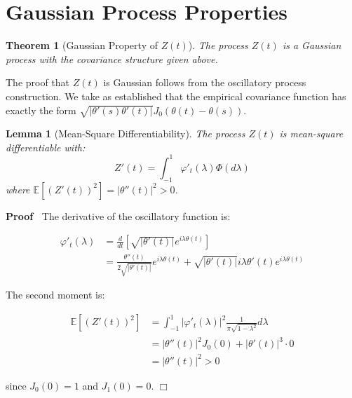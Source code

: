 \documentclass{article}
\newenvironment{proof}{\noindent\textbf{Proof\ }}{\hspace*{\fill}$\Box$\medskip}
\newtheorem{lemma}{Lemma}
\newtheorem{theorem}{Theorem}
\begin{document}
\section{Gaussian Process Properties}

\begin{theorem}
  [Gaussian Property of $Z (t)$] The process $Z (t)$ is a Gaussian process
  with the covariance structure given above.
\end{theorem}

\begin{remark}
  The proof that $Z (t)$ is Gaussian follows from the oscillatory process
  construction. We take as established that the empirical covariance function
  has exactly the form $\sqrt{| \theta' (s) \theta' (t) |} J_0  (\theta (t) -
  \theta (s))$.
\end{remark}

\begin{lemma}
  [Mean-Square Differentiability] The process $Z (t)$ is mean-square
  differentiable with:
  \begin{equation}
    Z' (t) = \int_{- 1}^1 \varphi'_t (\lambda) \Phi (d \lambda)
  \end{equation}
  where $\mathbb{E} [(Z' (t))^2] = | \theta'' (t) |^2 > 0$.
\end{lemma}

\begin{proof}
  The derivative of the oscillatory function is:
  
  \begin{align}
    \varphi'_t (\lambda) & = \frac{d}{dt}  \left[ \sqrt{| \theta' (t) |} e^{i
    \lambda \theta (t)} \right] \\
    & = \frac{\theta'' (t)}{2 \sqrt{| \theta' (t) |}} e^{i \lambda \theta
    (t)} + \sqrt{| \theta' (t) |} i \lambda \theta' (t) e^{i \lambda \theta
    (t)} 
  \end{align}
  
  The second moment is:
  
  \begin{align}
    \mathbb{E} [(Z' (t))^2] & = \int_{- 1}^1 | \varphi'_t (\lambda) |^2
    \frac{1}{\pi \sqrt{1 - \lambda^2}} d \lambda \\
    & = | \theta'' (t) |^2 J_0 (0) + | \theta' (t) |^3 \cdot 0 \\
    & = | \theta'' (t) |^2 > 0 
  \end{align}
  
  since $J_0 (0) = 1$ and $J_1 (0) = 0$.
\end{proof}
\end{document}
